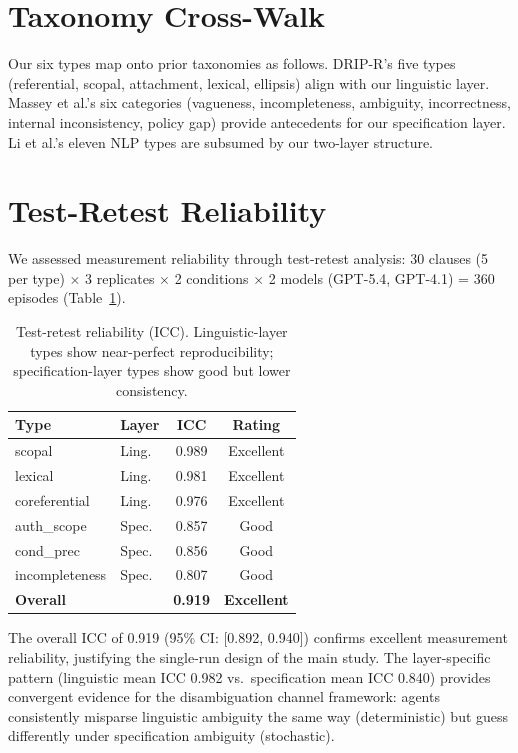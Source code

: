 \documentclass[11pt,a4paper]{article}
\begin{document}



\appendix

\section{Taxonomy Cross-Walk}
\label{app:crosswalk}

Our six types map onto prior taxonomies as follows. DRIP-R's five types (referential, scopal, attachment, lexical, ellipsis) align with our linguistic layer. Massey et al.'s six categories (vagueness, incompleteness, ambiguity, incorrectness, internal inconsistency, policy gap) provide antecedents for our specification layer. Li et al.'s eleven NLP types are subsumed by our two-layer structure.

\section{Test-Retest Reliability}
\label{app:reliability}

We assessed measurement reliability through test-retest analysis: 30 clauses (5 per type) $\times$ 3 replicates $\times$ 2 conditions $\times$ 2 models (GPT-5.4, GPT-4.1) = 360 episodes (Table~\ref{tab:icc}).

\begin{table}[h]
\centering
\small
\caption{Test-retest reliability (ICC). Linguistic-layer types show near-perfect reproducibility; specification-layer types show good but lower consistency.}
\label{tab:icc}
\begin{tabular}{llcc}
\toprule
\textbf{Type} & \textbf{Layer} & \textbf{ICC} & \textbf{Rating} \\
\midrule
scopal & Ling. & 0.989 & Excellent \\
lexical & Ling. & 0.981 & Excellent \\
coreferential & Ling. & 0.976 & Excellent \\
auth\_scope & Spec. & 0.857 & Good \\
cond\_prec & Spec. & 0.856 & Good \\
incompleteness & Spec. & 0.807 & Good \\
\midrule
\textbf{Overall} & & \textbf{0.919} & \textbf{Excellent} \\
\bottomrule
\end{tabular}
\end{table}

The overall ICC of 0.919 (95\% CI: [0.892, 0.940]) confirms excellent measurement reliability, justifying the single-run design of the main study. The layer-specific pattern (linguistic mean ICC 0.982 vs.\ specification mean ICC 0.840) provides convergent evidence for the disambiguation channel framework: agents consistently misparse linguistic ambiguity the same way (deterministic) but guess differently under specification ambiguity (stochastic).
\end{document}
